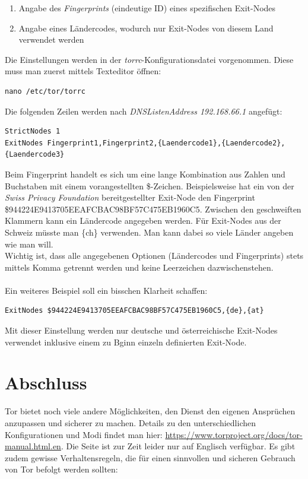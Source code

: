 \begin{enumerate}
\item Angabe des \textit{Fingerprints} (eindeutige ID) eines spezifischen Exit-Nodes
\item Angabe eines Ländercodes, wodurch nur Exit-Nodes von diesem Land verwendet werden
\end{enumerate}

Die Einstellungen werden in der \textit{torrc}-Konfigurationsdatei vorgenommen. Diese  muss man zuerst mittels Texteditor öffnen:

\begin{lstlisting}
nano /etc/tor/torrc
\end{lstlisting}

Die folgenden Zeilen werden nach \textit{DNSListenAddress 192.168.66.1} angefügt:

\begin{lstlisting}
StrictNodes 1
ExitNodes Fingerprint1,Fingerprint2,{Laendercode1},{Laendercode2},{Laendercode3}
\end{lstlisting}

Beim Fingerprint handelt es sich um eine lange Kombination aus Zahlen und Buchstaben mit einem vorangestellten \$-Zeichen. Beispielsweise hat ein von der \textit{Swiss Privacy Foundation} bereitgestellter Exit-Node den Fingerprint \$944224E9413705EEAFCBAC98BF57C475EB1960C5.
Zwischen den geschweiften Klammern kann ein Ländercode angegeben werden. Für Exit-Nodes aus der Schweiz müsste man \{ch\} verwenden. Man kann dabei so viele Länder angeben wie man will. 
\\
Wichtig ist, dass alle angegebenen Optionen (Ländercodes und Fingerprints) stets mittels Komma getrennt werden und keine Leerzeichen dazwischenstehen.
\\
\\
Ein weiteres Beispiel soll ein bisschen Klarheit schaffen:

\begin{lstlisting}
ExitNodes $944224E9413705EEAFCBAC98BF57C475EB1960C5,{de},{at}
\end{lstlisting}

Mit dieser Einstellung werden nur deutsche und österreichische Exit-Nodes verwendet inklusive einem zu Bginn einzeln definierten Exit-Node.

\section{Abschluss}
Tor bietet noch viele andere Möglichkeiten, den Dienst den eigenen Ansprüchen anzupassen und sicherer zu machen. Details zu den unterschiedlichen Konfigurationen und Modi findet man hier: \url{https://www.torproject.org/docs/tor-manual.html.en}. Die Seite ist zur Zeit leider nur auf Englisch verfügbar. Es gibt zudem gewisse Verhaltensregeln, die für einen sinnvollen und sicheren Gebrauch von Tor befolgt werden sollten: 

